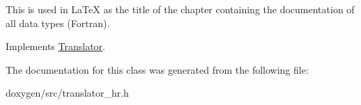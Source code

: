 This is used in La\+TeX as the title of the chapter containing the documentation of all data types (Fortran). 

Implements \mbox{\hyperlink{class_translator}{Translator}}.



The documentation for this class was generated from the following file\+:\begin{DoxyCompactItemize}
\item 
doxygen/src/translator\+\_\+hr.\+h\end{DoxyCompactItemize}
